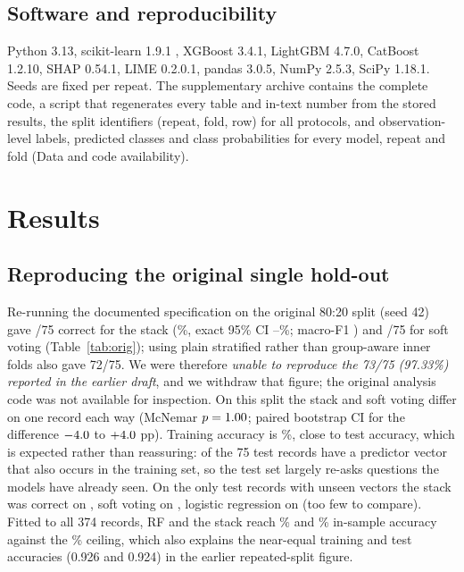 \documentclass[11pt,a4paper]{article}
\begin{document}
\subsection{Software and reproducibility}
Python 3.13, scikit-learn 1.9.1 \citep{pedregosa2011}, XGBoost 3.4.1, LightGBM 4.7.0, CatBoost 1.2.10, SHAP 0.54.1, LIME 0.2.0.1, pandas 3.0.5, NumPy 2.5.3, SciPy 1.18.1. Seeds are fixed per repeat. The supplementary archive contains the complete code, a script that regenerates every table and in-text number from the stored results, the split identifiers (repeat, fold, row) for all protocols, and observation-level labels, predicted classes and class probabilities for every model, repeat and fold (Data and code availability).

\section{Results}
\subsection{Reproducing the original single hold-out}\label{sec:orig}
Re-running the documented specification on the original 80:20 split (seed 42) gave \OrigStackCorrect/75 correct for the stack (\OrigStackAcc\%, exact 95\% CI \OrigStackCPlo--\OrigStackCPhi\%; macro-F1 \OrigStackF) and \OrigVoteCorrect/75 for soft voting (Table~\ref{tab:orig}); using plain stratified rather than group-aware inner folds also gave 72/75. We were therefore \emph{unable to reproduce the 73/75 (97.33\%) reported in the earlier draft}, and we withdraw that figure; the original analysis code was not available for inspection. On this split the stack and soft voting differ on one record each way (McNemar $p=1.00$; paired bootstrap CI for the difference $-4.0$ to $+4.0$ pp). Training accuracy is \OrigStackTrain\%, close to test accuracy, which is expected rather than reassuring: \OrigLeak{} of the 75 test records have a predictor vector that also occurs in the training set, so the test set largely re-asks questions the models have already seen. On the only \OrigNovel{} test records with unseen vectors the stack was correct on \OrigStackNovelCorrect, soft voting on \OrigVoteNovelCorrect, logistic regression on \OrigLRNovelCorrect{} (too few to compare). Fitted to all 374 records, RF and the stack reach \TrainAccRF\% and \TrainAccStack\% in-sample accuracy against the \Ceiling\% ceiling, which also explains the near-equal training and test accuracies (0.926 and 0.924) in the earlier repeated-split figure.
\end{document}
